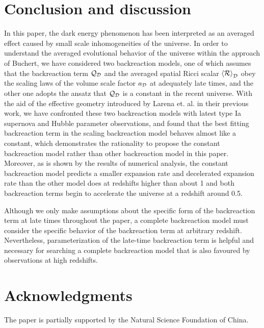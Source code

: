 \documentclass[preprint,preprintnumbers, prd, floatfix,  superscriptaddress,nofootinbib] {revtex4-1}
\newcommand{\CD}{{\cal D}}
\newcommand{\CR}{{\cal R}}
\newcommand{\average}[1]{\left\langle #1 \right\rangle_\CD}
\begin{document}
\section{Conclusion and discussion}
\label{sec:4}
In this paper, the dark energy phenomenon has been interpreted as an averaged effect caused by small scale inhomogeneities of the universe. In order to understand the averaged evolutional behavior of the universe within the approach of Buchert, we have considered two backreaction models, one of which assumes that the backreaction term ${\cal Q}_\CD$ and the averaged spatial Ricci scalar $\average{\CR}$ obey the scaling laws of the volume scale factor  $a_\CD$ at adequately late times, and the other one adopts the ansatz that ${\cal Q}_\CD$ is a constant in the recent universe. With the aid of the effective geometry introduced by Larena et. al. in their previous work, we have confronted these two backreaction models with latest type Ia supernova and Hubble parameter observations, and found that the best fitting  backreaction term in the scaling backreaction model behaves almost like a constant, which demonstrates the rationality to propose the constant backreaction model rather than other backreaction model in this paper. Moreover, as is shown by the results of numerical analysis, the constant backreaction model predicts a smaller expansion rate and decelerated expansion rate than the other model does at redshifts higher than about 1 and both backreaction terms begin to accelerate the universe at a redshift around 0.5.

Although we only make assumptions about the specific form of the backreaction term at late times throughout the paper, a complete backreaction model must consider the specific behavior of the backreaction term at arbitrary redshift. Nevertheless, parameterization of the late-time backreaction term is helpful and necessary for searching a complete backreaction model that is also favoured by observations at high redshifts.

\section*{Acknowledgments}
The paper is partially supported by the Natural Science Foundation of China.



\end{document}
